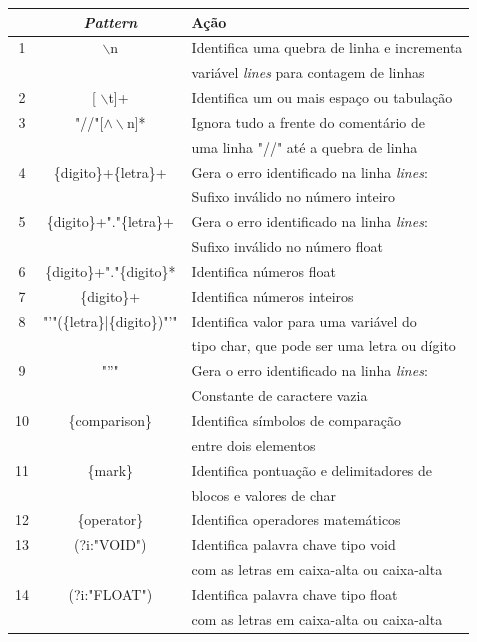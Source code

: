 \documentclass[12pt]{article}
\begin{document}
\indent

\begin{table}
 \centering
 \begin{tabular}{|c || c  l |} 
 \hline
   & \textit{Pattern} & Ação \\ [0.5ex] 
 \hline \hline
 1 & $\backslash$n	& Identifica uma quebra de linha e incrementa \\&& variável \textit{lines} para contagem de linhas \\ 
 \hline
 2 & [ $\backslash$t]+ 	& Identifica um ou mais espaço ou tabulação\\
 \hline
 3 & "//"[$\wedge\backslash$n]* & Ignora tudo a frente do comentário de \\&& uma linha "//" até a quebra de linha \\
 \hline
 4 & \{digito\}+\{letra\}+ & {\color{red}Gera o erro identificado na linha \textit{lines}:} \\&& {\color{red}Sufixo inválido no número inteiro} \\
 \hline
 5 & \{digito\}+"."\{letra\}+& {\color{red}Gera o erro identificado na linha \textit{lines}:} \\&& {\color{red}Sufixo inválido no número float} \\
 \hline
 6 & \{digito\}+"."\{digito\}* & Identifica números float\\
 \hline
 7 & \{digito\}+ & Identifica números inteiros\\
 \hline
 8 & "'"(\{letra\}|\{digito\})"'" & Identifica valor para uma variável do \\&& tipo char, que pode ser uma letra ou dígito\\
 \hline
 9 & "''" & {\color{red}Gera o erro identificado na linha \textit{lines}:} \\&& {\color{red}Constante de caractere vazia} \\
 \hline 
 10 & \{comparison\} & Identifica símbolos de comparação \\&& entre dois elementos \\
 \hline
 11 & \{mark\} & Identifica pontuação e delimitadores de \\&& blocos e valores de char\\
 \hline
 12 & \{operator\} & Identifica operadores matemáticos \\
 \hline
 13 & (?i:"VOID")& Identifica palavra chave tipo void \\&& com as letras em caixa-alta ou caixa-alta \\
 \hline
 14 & (?i:"FLOAT")& Identifica palavra chave tipo float \\&& com as letras em caixa-alta ou caixa-alta \\

\end{tabular}
\end{table}
\end{document}
